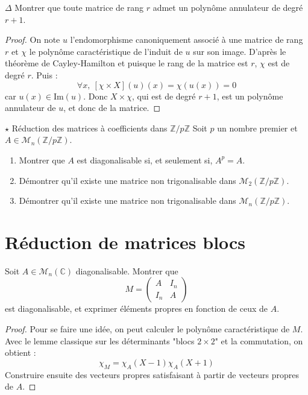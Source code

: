 \documentclass[french,a4paper]{article}
\newcommand{\Z}{\mathbb{Z}}
\newcommand{\C}{\mathbb{C}}
\newcommand{\im}{\text{Im}}
\theoremstyle{plain}
\theoremstyle{definition}
\theoremstyle{remark}
\begin{document}
\begin{ex}{$\Delta$}
	Montrer que toute matrice de rang $r$ admet un polynôme annulateur de degré $r+1$.
\end{ex}
\begin{proof}
	On note $u$ l'endomorphisme canoniquement associé à une matrice de rang $r$ et $\chi$ le polynôme caractéristique de l'induit de $u$ sur son image. D'après le théorème de Cayley-Hamilton et puisque le rang de la matrice est $r$, $\chi$ est de degré $r$. Puis : $$\forall x,\ \left[\chi \times X\right](u)(x)=\chi(u(x))=0$$ car $u(x)\in\im(u)$. Donc $X\times\chi$, qui est de degré $r+1$, est un polynôme annulateur de $u$, et donc de la matrice.
\end{proof}

\begin{ex}[Châteaux]{$\star$ Réduction des matrices à coefficients dans $\Z/p\Z$}
	Soit $p$ un nombre premier et $A\in\mathcal{M}_n(\Z/p\Z)$.
	\begin{enumerate}
		\item Montrer que $A$ est diagonalisable si, et seulement si, $A^p=A$.
		\item Démontrer qu'il existe une matrice non trigonalisable dans $\mathcal{M}_2(\Z/p\Z)$.
		\item Démontrer qu'il existe une matrice non trigonalisable dans $\mathcal{M}_n(\Z/p\Z)$.
	\end{enumerate}
\end{ex}

\section{Réduction de matrices blocs}

\begin{ex}{}
	Soit $A\in\mathcal{M}_n(\C)$ diagonalisable. Montrer que $$M=\begin{pmatrix}
		A&I_n\\
		I_n&A
	\end{pmatrix}$$ est diagonalisable, et exprimer éléments propres en fonction de ceux de $A$.
\end{ex}
\begin{proof}
	Pour se faire une idée, on peut calculer le polynôme caractéristique de $M$. Avec le lemme classique sur les déterminants "blocs $2\times2$" et la commutation, on obtient : $$\chi_M=\chi_A(X-1)\chi_A(X+1)$$ Construire ensuite des vecteurs propres satisfaisant à partir de vecteurs propres de $A$.
\end{proof}
\end{document}
